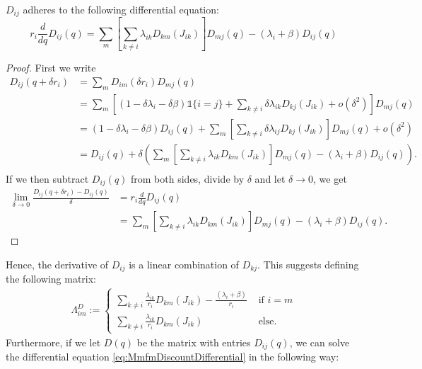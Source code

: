 \begin{lemma}
	$D_{ij}$ adheres to the following differential equation:
	\begin{equation}\label{eq:MmfmDiscountDifferential}
	r_i\frac{d}{dq}D_{ij}(q)=\sum\limits_m\left[\sum\limits_{k\neq i}\lambda_{ik}D_{km}(J_{ik})\right] D_{mj}(q)-(\lambda_i+\beta)D_{ij}(q)
	\end{equation}
	\begin{proof}
		First we write
		\[
		\begin{split}
		D_{ij}(q+\delta r_i)&=\sum_mD_{im}(\delta r_i)D_{mj}(q)\\
		&=\sum\limits_m\left[(1-\delta\lambda_i-\delta\beta)\mathds{1}\{i=j\}+\sum\limits_{k\neq i}\delta\lambda_{ik}D_{kj}(J_{ik})+o(\delta^2)\right]D_{mj}(q)\\
		&=(1-\delta\lambda_i-\delta\beta)D_{ij}(q)+\sum\limits_m\left[\sum\limits_{k\neq i}\delta\lambda_{ij}D_{kj}(J_{ik})\right]D_{mj}(q)+o(\delta^2)\\
		&=D_{ij}(q)+\delta\left( \sum\limits_m\left[\sum\limits_{k\neq i}\lambda_{ik}D_{km}(J_{ik})\right] D_{mj}(q)-(\lambda_i+\beta)D_{ij}(q) \right).\\
		\end{split}
		\]
		If we then subtract $D_{ij}(q)$ from both sides, divide by $\delta$ and let $\delta\rightarrow 0$, we get
		\[
		\begin{split}
		\lim\limits_{\delta\rightarrow 0}\frac{D_{ij}(q+\delta r_i)-D_{ij}(q)}{\delta}&=r_i\frac{d}{dq}D_{ij}(q)\\
		&=\sum\limits_m\left[\sum\limits_{k\neq i}\lambda_{ik}D_{km}(J_{ik})\right] D_{mj}(q)-(\lambda_i+\beta)D_{ij}(q).
		\end{split}
		\]
	\end{proof}
\end{lemma}
Hence, the derivative of $D_{ij}$ is a linear combination of $D_{kj}$.
This suggests defining the following matrix:
\begin{equation}\label{eq:MmfmDiscountGenerator}
\begin{split}
\Lambda^D_{im}:=\begin{cases}
\sum\limits_{k\neq i}\frac{\lambda_{ik}}{r_i}D_{km}(J_{ik})-\frac{(\lambda_i+\beta)}{r_i}&\text{ if }i=m\\
\sum\limits_{k\neq i}\frac{\lambda_{ik}}{r_i}D_{km}(J_{ik})&\text{ else.}
\end{cases}
\end{split}
\end{equation}
Furthermore, if we let $D(q)$ be the matrix with entries $D_{ij}(q)$, we can solve the differential equation \eqref{eq:MmfmDiscountDifferential} in the following way:
